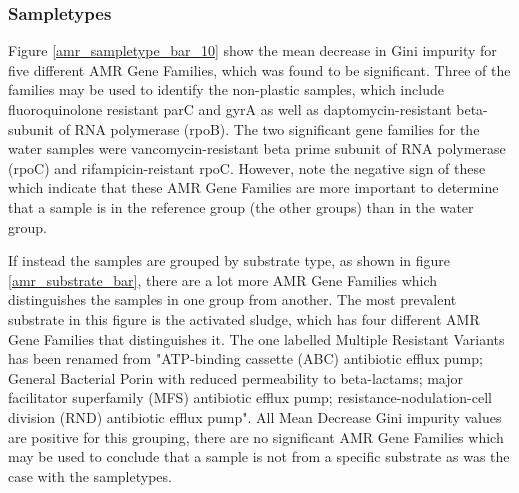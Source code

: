 \subsubsection{Sampletypes}
Figure \ref{amr_sampletype_bar_10} show the mean decrease in Gini impurity for five different AMR Gene Families, which was found to be significant.
Three of the families may be used to identify the non-plastic samples, which include fluoroquinolone resistant parC and gyrA as well as daptomycin-resistant beta-subunit of RNA polymerase (rpoB). 
The two significant gene families for the water samples were vancomycin-resistant beta prime subunit of RNA polymerase (rpoC) and rifampicin-reistant rpoC. 
However, note the negative sign of these which indicate that these AMR Gene Families are more important to determine that a sample is in the reference group (the other groups) than in the water group. 

If instead the samples are grouped by substrate type, as shown in figure \ref{amr_substrate_bar}, there are a lot more AMR Gene Families which distinguishes the samples in one group from another.
The most prevalent substrate in this figure is the activated sludge, which has four different AMR Gene Families that distinguishes it.
The one labelled Multiple Resistant Variants has been renamed from "ATP-binding cassette (ABC) antibiotic efflux pump; General Bacterial Porin with reduced permeability to beta-lactams; major facilitator superfamily (MFS) antibiotic efflux pump; resistance-nodulation-cell division (RND) antibiotic efflux pump". 
All Mean Decrease Gini impurity values are positive for this grouping, there are no significant AMR Gene Families which may be used to conclude that a sample is not from a specific substrate as was the case with the sampletypes. 


